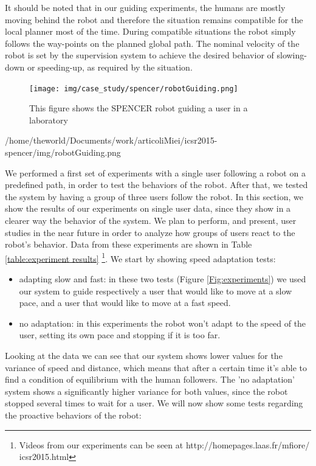 It should be noted that in our guiding experiments, the humans are mostly moving behind the robot and therefore the situation remains compatible for the local planner most of the time. During compatible situations the robot simply follows the way-points on the planned global path. The nominal velocity of the robot is set by the supervision system to achieve the desired behavior of slowing-down or speeding-up, as required by the situation. 



\begin{figure}[ht!]
	\centering
	\texttt{[image: img/case\_study/spencer/robotGuiding.png]}
	\caption{This figure shows the SPENCER robot guiding a user in a laboratory}
	\label{fig:case_study-spencer-robotGuiding}
\end{figure}

/home/theworld/Documents/work/articoliMiei/icsr2015-spencer/img/robotGuiding.png


We performed a first set of experiments with a single user following a robot on a predefined path, in order to test the behaviors of the robot. After that, we tested the system by having a group of three users follow the robot. In this section, we show the results of our experiments on single user data, since they show in a clearer way the behavior of the system. We plan to perform, and present, user studies in the near future in order to analyze how groups of users react to the robot's behavior. Data from these experiments are shown in Table \ref{table:experiment results} \footnote{Videos from our experiments can be seen at http://homepages.laas.fr/mfiore/
icsr2015.html}. We start by showing speed adaptation tests:
\begin{itemize}
\item adapting slow and fast: in these two tests (Figure \ref{Fig:experiments}) we used our system to guide respectively a user that would like to move at a slow pace, and a user that would like to move at a fast speed.
\item no adaptation: in this experiments the robot won't adapt to the speed of the user, setting its own pace and stopping if it is too far.
\end{itemize}

Looking at the data we can see that our system shows lower values for the variance of speed and distance, which means that after a certain time it's able to find a condition of equilibrium with the human followers. The 'no adaptation' system shows a significantly higher variance for both values, since the robot stopped several times to wait for a user. We will now show some tests regarding the proactive behaviors of the robot:

